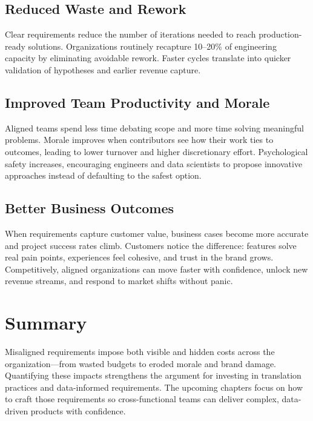 \subsection{Reduced Waste and Rework}
Clear requirements reduce the number of iterations needed to reach production-ready solutions. Organizations routinely recapture 10--20\% of engineering capacity by eliminating avoidable rework. Faster cycles translate into quicker validation of hypotheses and earlier revenue capture.

\subsection{Improved Team Productivity and Morale}
Aligned teams spend less time debating scope and more time solving meaningful problems. Morale improves when contributors see how their work ties to outcomes, leading to lower turnover and higher discretionary effort. Psychological safety increases, encouraging engineers and data scientists to propose innovative approaches instead of defaulting to the safest option.

\subsection{Better Business Outcomes}
When requirements capture customer value, business cases become more accurate and project success rates climb. Customers notice the difference: features solve real pain points, experiences feel cohesive, and trust in the brand grows. Competitively, aligned organizations can move faster with confidence, unlock new revenue streams, and respond to market shifts without panic.

\section{Summary}
\label{sec:costs-summary}

Misaligned requirements impose both visible and hidden costs across the organization---from wasted budgets to eroded morale and brand damage. Quantifying these impacts strengthens the argument for investing in translation practices and data-informed requirements. The upcoming chapters focus on how to craft those requirements so cross-functional teams can deliver complex, data-driven products with confidence.

